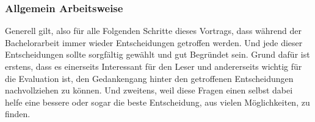 \subsubsection{Allgemein Arbeitsweise}
Generell gilt, also für alle Folgenden Schritte dieses Vortrags, dass während der Bachelorarbeit immer wieder Entscheidungen getroffen werden. Und jede dieser Entscheidungen sollte sorgfältig gewählt und gut Begründet sein. \newline
Grund dafür ist erstens, dass es einerseits Interessant für den Leser und andererseits wichtig für die Evaluation ist, den Gedankengang hinter den getroffenen Entscheidungen nachvollziehen zu können. \newline
Und zweitens, weil diese Fragen einen selbst dabei helfe eine bessere oder sogar die beste Entscheidung, aus vielen Möglichkeiten, zu finden.